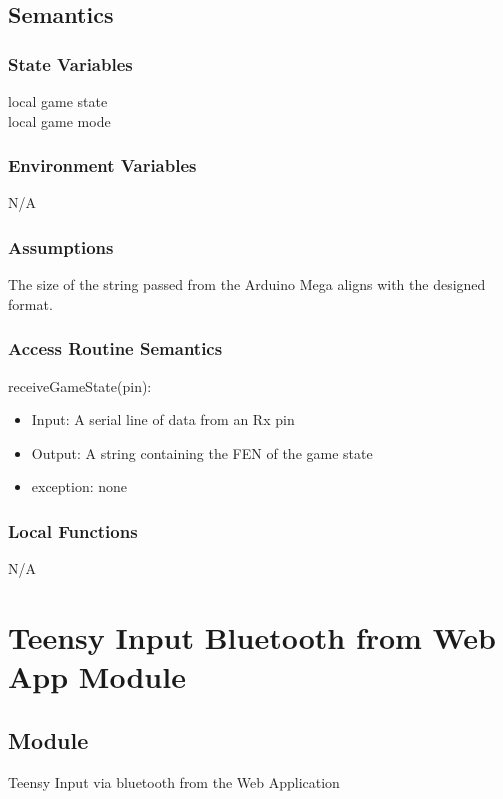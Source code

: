 \documentclass[12pt, titlepage]{article}
\begin{document}
    \subsection{Semantics}
    \subsubsection{State Variables}
    local game state \\
    local game mode

    \subsubsection{Environment Variables}
    N/A

    \subsubsection{Assumptions}
    The size of the string passed from the Arduino Mega aligns with the designed format. \\

    \subsubsection{Access Routine Semantics}
        \noindent receiveGameState(pin):
        \begin{itemize}
            \item Input: A serial line of data from an Rx pin
            \item Output: A string containing the FEN of the game state
            \item exception: none
        \end{itemize}

    \subsubsection{Local Functions}
    N/A

\newpage

\section{Teensy Input Bluetooth from Web App Module} \label{TeensyToWaRx}
    \subsection{Module}
    Teensy Input via bluetooth from the Web Application
\end{document}
